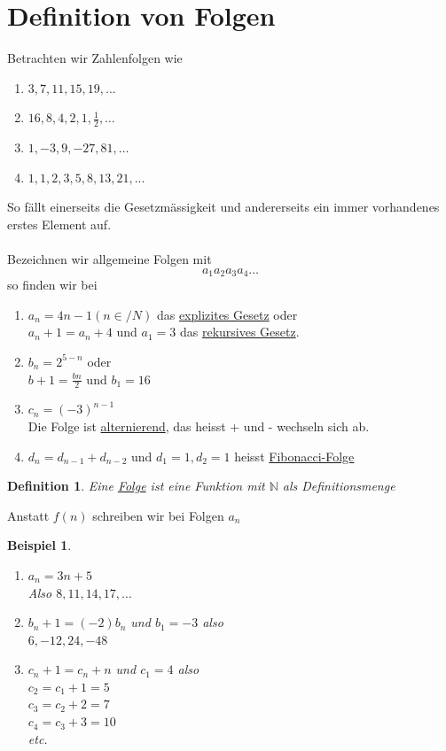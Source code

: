 \documentclass[a4paper,10pt]{report}
\newtheorem{mydef}{Definition}
\newtheorem{myexample}{Beispiel}
\newcommand{\N}{{\mathbb N}}
\begin{document}
\section{Definition von Folgen}
Betrachten wir Zahlenfolgen wie
\begin{enumerate}
\item $3, 7, 11, 15, 19, \ldots$
\item $16, 8, 4, 2, 1 , \frac{1}{2}, \ldots$
\item $1, -3, 9, -27, 81,\ldots$
\item $1, 1, 2, 3, 5, 8, 13, 21, ...$
\end{enumerate}
So fällt einerseits die Gesetzmässigkeit und andererseits ein immer vorhandenes erstes Element auf.\\
\\
Bezeichnen wir allgemeine Folgen mit
\begin{equation*}a_1 a_2 a_3 a_4 \ldots\end{equation*}
so finden wir bei
\begin{enumerate}
\item
$a_n = 4n -1 (n\in /N)$ das \underline{explizites Gesetz} oder\\
$a_n + 1 = a_n + 4$ und $a_1 = 3$ das \underline{rekursives Gesetz}.
\item
$b_n = 2^{5-n}$ oder \\
$b+1 = \frac{bn}{2}$ und $b_1 = 16$
\item
$c_n = (-3)^{n-1}$\\
Die Folge ist \underline{alternierend}, das heisst + und - wechseln sich ab. 
\item
$d_n = d_{n-1}+ d_{n-2}$ und $d_1 = 1, d_2 = 1$
heisst \underline{Fibonacci-Folge}
\end{enumerate}
\newpage
\begin{mydef}Eine \underline{Folge} ist eine Funktion mit $\N$ als Definitionsmenge\end{mydef}
Anstatt $f(n)$ schreiben wir bei Folgen $a_n$
\begin{myexample}
	\begin{enumerate}
		\item
		$a_n = 3n + 5$\\ 
		Also $8, 11, 14,17, \ldots$
		\item
		$b_n+1 = (-2)b_n$ und $b_1 = -3$ also\\
		$6, -12, 24, -48$
		\item
		$c_n + 1 = c_n + n$ und $c_1 = 4$ also\\
		$c_2 = c_1 + 1 = 5$\\
		$c_3 = c_2 + 2 = 7$\\
		$c_4 = c_3 + 3 = 10$\\
		etc.
	\end{enumerate}
\end{myexample}
\newpage
\end{document}
